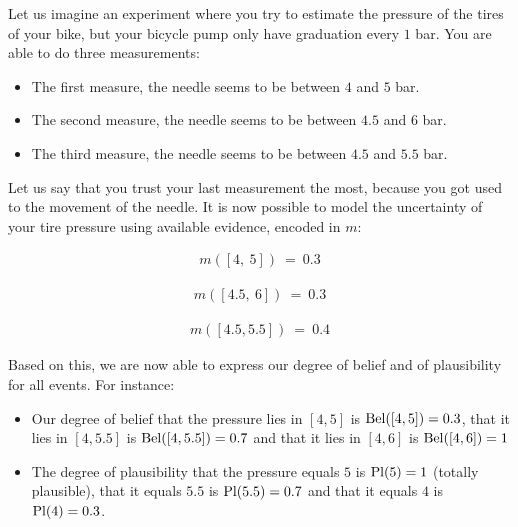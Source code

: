 \begin{example}\label{ex:bicycle_pressure}
    Let us imagine an experiment where you try to estimate the pressure of the tires of your bike, but your bicycle pump only have graduation every $1$ bar. You are able to do three measurements:
    \begin{itemize}
        \item The first measure, the needle seems to be between $4$ and $5$ bar.
        \item The second measure, the needle seems to be between $4.5$ and $6$ bar.
        \item The third measure, the needle seems to be between $4.5$ and $5.5$ bar.
    \end{itemize}
    Let us say that you trust your last measurement the most, because you got used to the movement of the needle. It is now possible to model the uncertainty of your tire pressure using available evidence, encoded in $m$:\newline
    \begin{minipage}{0.3\textwidth}
        \begin{align*}
            m([4,~5]) ~=~ 0.3
        \end{align*}
    \end{minipage}\hfill
    \begin{minipage}{0.3\textwidth}
        \begin{align*}
            m([4.5,~6]) ~=~ 0.3
        \end{align*}
    \end{minipage}\hfill
    \begin{minipage}{0.3\textwidth}
        \begin{align*}
             m([4.5,5.5]) ~=~ 0.4
        \end{align*}
    \end{minipage}\bigskip\newline
    Based on this, we are now able to express our degree of belief and of plausibility for all events. For instance:
    \begin{itemize}
        \item Our degree of belief that the pressure lies in $[4, 5]$ is $\mathrm{Bel}([4, 5])=0.3$, that it lies in $[4, 5.5]$ is $\mathrm{Bel}([4, 5.5])=0.7$ and that it lies in $[4, 6]$ is $\mathrm{Bel}([4, 6])=1$
        \item The degree of plausibility that the pressure equals $5$ is $\mathrm{Pl} (5)=1$ (totally plausible), that it equals $5.5$ is $\mathrm{Pl} (5.5)=0.7$ and that it equals $4$ is $\mathrm{Pl} (4)=0.3$.
    \end{itemize}
\end{example}

